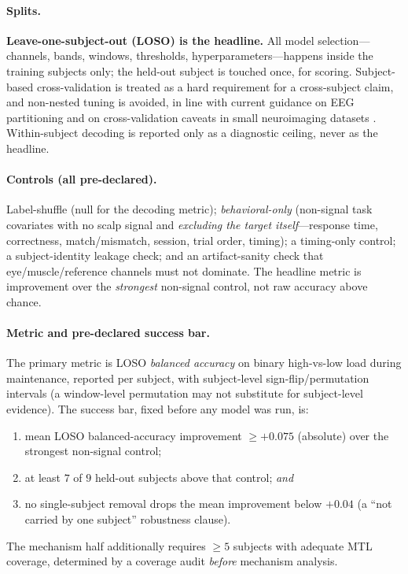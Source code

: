 \documentclass[11pt]{article}
\begin{document}
\paragraph{Splits.} \textbf{Leave-one-subject-out (LOSO) is the headline.} All model
selection---channels, bands, windows, thresholds, hyperparameters---happens inside the training
subjects only; the held-out subject is touched once, for scoring. Subject-based cross-validation is
treated as a hard requirement for a cross-subject claim, and non-nested tuning is avoided, in line
with current guidance on EEG partitioning \cite{delpup2025partitioning} and on cross-validation
caveats in small neuroimaging datasets \cite{varoquaux2016assessing}. Within-subject decoding is
reported only as a diagnostic ceiling, never as the headline.

\paragraph{Controls (all pre-declared).} Label-shuffle (null for the decoding metric);
\emph{behavioral-only} (non-signal task covariates with no scalp signal and \emph{excluding the
target itself}---response time, correctness, match/mismatch, session, trial order, timing); a
timing-only control; a subject-identity leakage check; and an artifact-sanity check that
eye/muscle/reference channels must not dominate. The headline metric is improvement over the
\emph{strongest} non-signal control, not raw accuracy above chance.

\paragraph{Metric and pre-declared success bar.} The primary metric is LOSO \emph{balanced
accuracy} on binary high-vs-low load during maintenance, reported per subject, with subject-level
sign-flip/permutation intervals (a window-level permutation may not substitute for subject-level
evidence). The success bar, fixed before any model was run, is:
\begin{enumerate}[nosep,label=(\roman*)]
  \item mean LOSO balanced-accuracy improvement $\geq +0.075$ (absolute) over the strongest
  non-signal control;
  \item at least $7$ of $9$ held-out subjects above that control; \emph{and}
  \item no single-subject removal drops the mean improvement below $+0.04$ (a ``not carried by one
  subject'' robustness clause).
\end{enumerate}
The mechanism half additionally requires $\geq 5$ subjects with adequate MTL coverage, determined
by a coverage audit \emph{before} mechanism analysis.
\end{document}

